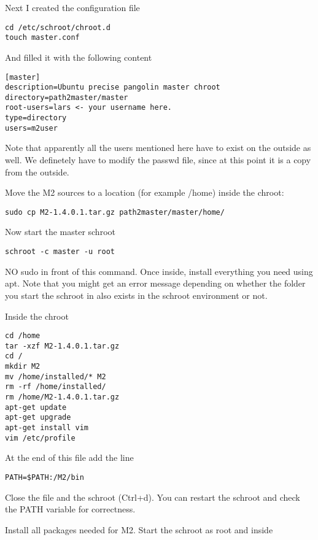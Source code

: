 \documentclass[a4paper]{article}
\begin{document}
Next I created the configuration file

\begin{verbatim}
cd /etc/schroot/chroot.d
touch master.conf
\end{verbatim}

And filled it with the following content

\begin{verbatim}
[master]
description=Ubuntu precise pangolin master chroot
directory=path2master/master
root-users=lars <- your username here.
type=directory
users=m2user
\end{verbatim}

Note that apparently all the users mentioned here have to exist on the outside as well.
We definetely have to modify the passwd file, since at this point it is a copy from the outside.

Move the M2 sources to a location (for example /home) inside the chroot:

\begin{verbatim}
sudo cp M2-1.4.0.1.tar.gz path2master/master/home/
\end{verbatim}

Now start the master schroot

\begin{verbatim}
schroot -c master -u root
\end{verbatim}

NO sudo in front of this command. Once inside, install everything you need using apt.
Note that you might get an error message depending on whether the folder you start the schroot in also exists in the schroot environment or not.

Inside the chroot

\begin{verbatim}
cd /home
tar -xzf M2-1.4.0.1.tar.gz
cd /
mkdir M2
mv /home/installed/* M2
rm -rf /home/installed/
rm /home/M2-1.4.0.1.tar.gz
apt-get update
apt-get upgrade
apt-get install vim
vim /etc/profile
\end{verbatim}

At the end of this file add the line

\begin{verbatim}
PATH=$PATH:/M2/bin
\end{verbatim}

Close the file and the schroot (Ctrl+d). You can restart the schroot and check the PATH variable for correctness.

Install all packages needed for M2. Start the schroot as root and inside
\end{document}
